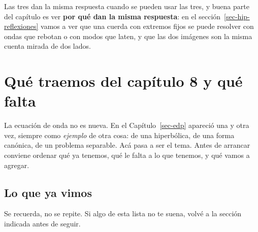 \documentclass[
  spanish,
  a4paper,
]{scrbook}
\theoremstyle{definition}
\theoremstyle{plain}
\theoremstyle{definition}
\theoremstyle{plain}
\theoremstyle{definition}
\theoremstyle{remark}
\begin{document}
Las tres dan la misma respuesta cuando se pueden usar las tres, y buena
parte del capítulo es ver \textbf{por qué dan la misma respuesta}: en el
sección~\ref{sec-hip-reflexiones} vamos a ver que una cuerda con
extremos fijos se puede resolver con ondas que rebotan o con modos que
laten, y que las dos imágenes son la misma cuenta mirada de dos lados.

\section{Qué traemos del capítulo 8 y qué falta}\label{sec-hip-puente}

La ecuación de onda no es nueva. En el Capítulo~\ref{sec-edp} apareció
una y otra vez, siempre como \emph{ejemplo} de otra cosa: de una
hiperbólica, de una forma canónica, de un problema separable. Acá pasa a
ser el tema. Antes de arrancar conviene ordenar qué ya tenemos, qué le
falta a lo que tenemos, y qué vamos a agregar.

\subsection{Lo que ya vimos}\label{sec-hip-ya-vimos}

Se recuerda, no se repite. Si algo de esta lista no te suena, volvé a la
sección indicada antes de seguir.
\end{document}

